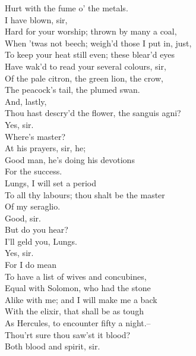 \documentclass{memoir}
\begin{document}
\begin{drama*}
 Hurt with the fume o' the metals.\\
\facespeaks {} I have blown, sir,\\
 Hard for your worship; thrown by many a coal,\\
 When 'twas not beech; weigh'd those I put in, just,\\
 To keep your heat still even; these blear'd eyes\\
 Have wak'd to read your several colours, sir,\\
 Of the pale citron, the green lion, the crow,\\
 The peacock's tail, the plumed swan.\\
\mammonspeaks {} And, lastly,\\
 Thou hast descry'd the flower, the sanguis agni?\\
\facespeaks  Yes, sir.\\
\mammonspeaks {} Where's master?\\
\facespeaks {} At his prayers, sir, he;\\
 Good man, he's doing his devotions\\
 For the success.\\
\mammonspeaks {} Lungs, I will set a period\\
 To all thy labours; thou shalt be the master\\
 Of my seraglio.\\
\facespeaks {} Good, sir.\\
\mammonspeaks {} But do you hear?\\
 I'll geld you, Lungs.\\
\facespeaks {} Yes, sir.\\
\mammonspeaks {} For I do mean\\
 To have a list of wives and concubines,\\
 Equal with Solomon, who had the stone\\
 Alike with me; and I will make me a back\\
 With the elixir, that shall be as tough\\
 As Hercules, to encounter fifty a night.--\\
 Thou'rt sure thou saw'st it blood?\\
\facespeaks {} Both blood and spirit, sir.\\

\end{drama*}
\end{document}
